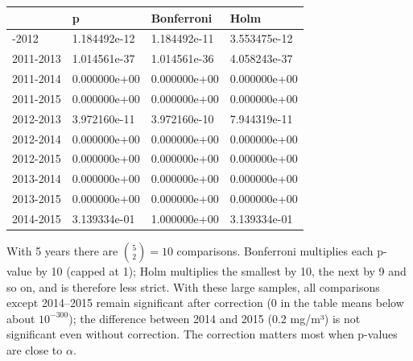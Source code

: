 \documentclass[
  letterpaper,
  DIV=11,
  numbers=noendperiod]{scrreprt}
\begin{document}
\begin{tcolorbox}
\begin{longtable}[]{@{}llll@{}}
\toprule\noalign{}
& p & Bonferroni & Holm \\
\midrule\noalign{}
\endhead
\bottomrule\noalign{}
\endlastfoot
2011-2012 & 1.184492e-12 & 1.184492e-11 & 3.553475e-12 \\
2011-2013 & 1.014561e-37 & 1.014561e-36 & 4.058243e-37 \\
2011-2014 & 0.000000e+00 & 0.000000e+00 & 0.000000e+00 \\
2011-2015 & 0.000000e+00 & 0.000000e+00 & 0.000000e+00 \\
2012-2013 & 3.972160e-11 & 3.972160e-10 & 7.944319e-11 \\
2012-2014 & 0.000000e+00 & 0.000000e+00 & 0.000000e+00 \\
2012-2015 & 0.000000e+00 & 0.000000e+00 & 0.000000e+00 \\
2013-2014 & 0.000000e+00 & 0.000000e+00 & 0.000000e+00 \\
2013-2015 & 0.000000e+00 & 0.000000e+00 & 0.000000e+00 \\
2014-2015 & 3.139334e-01 & 1.000000e+00 & 3.139334e-01 \\
\end{longtable}

With 5 years there are \(\binom{5}{2} = 10\) comparisons. Bonferroni
multiplies each p-value by 10 (capped at 1); Holm multiplies the
smallest by 10, the next by 9 and so on, and is therefore less strict.
With these large samples, all comparisons except 2014--2015 remain
significant after correction (0 in the table means below about
\(10^{-300}\)); the difference between 2014 and 2015 (0.2 mg/m³) is not
significant even without correction. The correction matters most when
p-values are close to \(\alpha\).

\end{tcolorbox}
\end{document}
